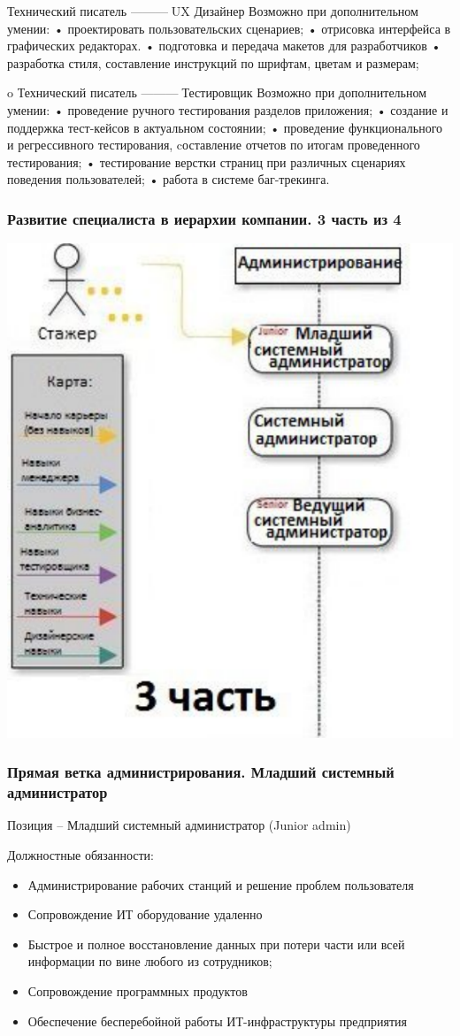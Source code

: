\documentclass{../industrial-development}
\begin{document}
\lecturenotes
Технический писатель ---------UX Дизайнер
Возможно при дополнительном умении:
•	проектировать пользовательских сценариев;
•	отрисовка интерфейса в графических редакторах.
•	подготовка и передача макетов для разработчиков
•	разработка стиля, составление инструкций по шрифтам, цветам и размерам;


o	Технический писатель ---------Тестировщик
Возможно при дополнительном умении:
•	проведение ручного тестирования разделов приложения;
•	создание и поддержка тест-кейсов в актуальном состоянии;
•	проведение функционального и регрессивного тестирования, cоставление отчетов по итогам проведенного тестирования;
•	тестирование верстки страниц при различных сценариях поведения пользователей;
•	работа в системе баг-трекинга.




\begin{frame} \frametitle{Развитие  специалиста в иерархии компании. 3 часть из 4 }
  \centerline{\includegraphics[width=0.62\linewidth]{11-IT-specialist's-way/sch13.pdf}}
\end{frame}


\begin{frame} \frametitle{Прямая ветка администрирования. Младший системный администратор }
 \begin{block}{}
  \alert{Позиция – Младший системный администратор (Junior admin)}

Должностные обязанности: 
  \end{block}
  \begin{itemize}
  \item   Администрирование рабочих станций и решение проблем пользователя
  \item  Сопровождение ИТ оборудование удаленно
  \item Быстрое и полное восстановление данных при потери части или всей информации по вине любого из сотрудников;
 \item Сопровождение программных продуктов
 \item Обеспечение бесперебойной работы ИТ-инфраструктуры предприятия
  \end{itemize}
\end{frame}
\end{document}
